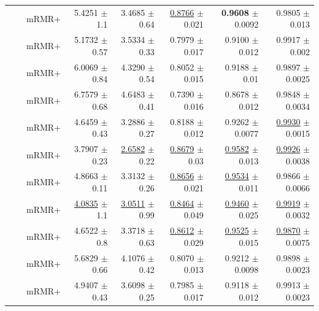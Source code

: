 \begin{longtable}{llp{}rrrrr}
 &  & mRMR+ & 5.4251 {\scriptsize $\pm$ 1.1} & 3.4685 {\scriptsize $\pm$ 0.64} & \underline{0.8766} {\scriptsize $\pm$ 0.021} & \textbf{0.9608} {\scriptsize $\pm$ 0.0092} & 0.9805 {\scriptsize $\pm$ 0.013} \\
 &  & mRMR+ & 5.1732 {\scriptsize $\pm$ 0.57} & 3.5334 {\scriptsize $\pm$ 0.33} & 0.7979 {\scriptsize $\pm$ 0.017} & 0.9100 {\scriptsize $\pm$ 0.012} & 0.9917 {\scriptsize $\pm$ 0.002} \\
 &  & mRMR+ & 6.0069 {\scriptsize $\pm$ 0.84} & 4.3290 {\scriptsize $\pm$ 0.54} & 0.8052 {\scriptsize $\pm$ 0.015} & 0.9188 {\scriptsize $\pm$ 0.01} & 0.9897 {\scriptsize $\pm$ 0.0025} \\
 &  & mRMR+ & 6.7579 {\scriptsize $\pm$ 0.68} & 4.6483 {\scriptsize $\pm$ 0.41} & 0.7390 {\scriptsize $\pm$ 0.016} & 0.8678 {\scriptsize $\pm$ 0.012} & 0.9848 {\scriptsize $\pm$ 0.0034} \\
 &  & mRMR+ & 4.6459 {\scriptsize $\pm$ 0.43} & 3.2886 {\scriptsize $\pm$ 0.27} & 0.8188 {\scriptsize $\pm$ 0.012} & 0.9262 {\scriptsize $\pm$ 0.0077} & \underline{0.9930} {\scriptsize $\pm$ 0.0015} \\
 &  & mRMR+ & 3.7907 {\scriptsize $\pm$ 0.23} & \underline{2.6582} {\scriptsize $\pm$ 0.22} & \underline{0.8679} {\scriptsize $\pm$ 0.03} & \underline{0.9582} {\scriptsize $\pm$ 0.013} & \underline{0.9926} {\scriptsize $\pm$ 0.0038} \\
 &  & mRMR+ & 4.8663 {\scriptsize $\pm$ 0.11} & 3.3132 {\scriptsize $\pm$ 0.26} & \underline{0.8656} {\scriptsize $\pm$ 0.021} & \underline{0.9534} {\scriptsize $\pm$ 0.011} & 0.9866 {\scriptsize $\pm$ 0.0066} \\
 &  & mRMR+ & \underline{4.0835} {\scriptsize $\pm$ 1.1} & \underline{3.0511} {\scriptsize $\pm$ 0.99} & \underline{0.8464} {\scriptsize $\pm$ 0.049} & \underline{0.9460} {\scriptsize $\pm$ 0.025} & \underline{0.9919} {\scriptsize $\pm$ 0.0032} \\
 &  & mRMR+ & 4.6522 {\scriptsize $\pm$ 0.8} & 3.3718 {\scriptsize $\pm$ 0.63} & \underline{0.8612} {\scriptsize $\pm$ 0.029} & \underline{0.9525} {\scriptsize $\pm$ 0.015} & \underline{0.9870} {\scriptsize $\pm$ 0.0075} \\
 &  & mRMR+ & 5.6829 {\scriptsize $\pm$ 0.66} & 4.1076 {\scriptsize $\pm$ 0.42} & 0.8070 {\scriptsize $\pm$ 0.013} & 0.9212 {\scriptsize $\pm$ 0.0098} & 0.9898 {\scriptsize $\pm$ 0.0023} \\
 &  & mRMR+ & 4.9407 {\scriptsize $\pm$ 0.43} & 3.6098 {\scriptsize $\pm$ 0.25} & 0.7985 {\scriptsize $\pm$ 0.017} & 0.9118 {\scriptsize $\pm$ 0.012} & 0.9913 {\scriptsize $\pm$ 0.0023} \\

\end{longtable}
